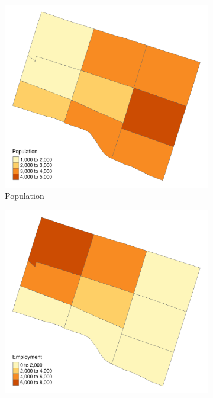\documentclass[]{elsarticle} %
\begin{document}
\begin{figure}
\begin{subfigure}{0.48\textwidth}
  \centering
  \includegraphics[width=1\linewidth]{Plots/map_population.pdf}  
  \caption{Population}
\end{subfigure}\hfill
\begin{subfigure}{0.48\textwidth}
  \centering
  \includegraphics[width=1\linewidth]{Plots/map_employment.pdf}  

\end{subfigure}
\end{figure}
\end{document}
